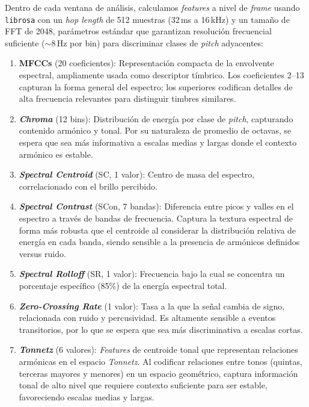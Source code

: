 \documentclass[conference]{IEEEtran}
\begin{document}
Dentro de cada ventana de análisis, calculamos \textit{features} a nivel de \textit{frame} usando \texttt{librosa} con un \textit{hop length} de 512 muestras (32\,ms a 16\,kHz) y un tamaño de FFT de 2048, 
parámetros estándar que garantizan resolución frecuencial suficiente ($\sim$8\,Hz por bin) para discriminar clases de \textit{pitch} adyacentes:

\begin{enumerate}
    \item \textbf{MFCCs} (20 coeficientes): Representación compacta de la envolvente espectral, ampliamente usada como descriptor tímbrico.
    Los coeficientes 2--13 capturan la forma general del espectro; los superiores codifican detalles de alta frecuencia relevantes para distinguir timbres similares.

    \item \textbf{\textit{Chroma}} (12 bins): Distribución de energía por clase de \textit{pitch}, capturando contenido armónico y tonal.
    Por su naturaleza de promedio de octavas, se espera que sea más informativa a escalas medias y largas donde el contexto armónico es estable.

    \item \textbf{\textit{Spectral Centroid}} (SC, 1 valor): Centro de masa del espectro, correlacionado con el brillo percibido.

    \item \textbf{\textit{Spectral Contrast}} (SCon, 7 bandas): Diferencia entre picos y valles en el espectro a través de bandas de frecuencia.
    Captura la textura espectral de forma más robusta que el centroide al considerar la distribución relativa de energía en cada banda, siendo sensible a la presencia de armónicos definidos versus ruido.

    \item \textbf{\textit{Spectral Rolloff}} (SR, 1 valor): Frecuencia bajo la cual se concentra un porcentaje específico (85\%) de la energía espectral total.

    \item \textbf{\textit{Zero-Crossing Rate}} (1 valor): Tasa a la que la señal cambia de signo, relacionada con ruido y percusividad.
    Es altamente sensible a eventos transitorios, por lo que se espera que sea más discriminativa a escalas cortas.

    \item \textbf{\textit{Tonnetz}} (6 valores): \textit{Features} de 
    centroide tonal que representan relaciones armónicas en el espacio \textit{Tonnetz}. Al codificar relaciones entre tonos (quintas, terceras mayores y menores) en un espacio geométrico, captura 
    información tonal de alto nivel que requiere contexto suficiente para ser estable, favoreciendo escalas medias y largas.
\end{enumerate}
\end{document}
